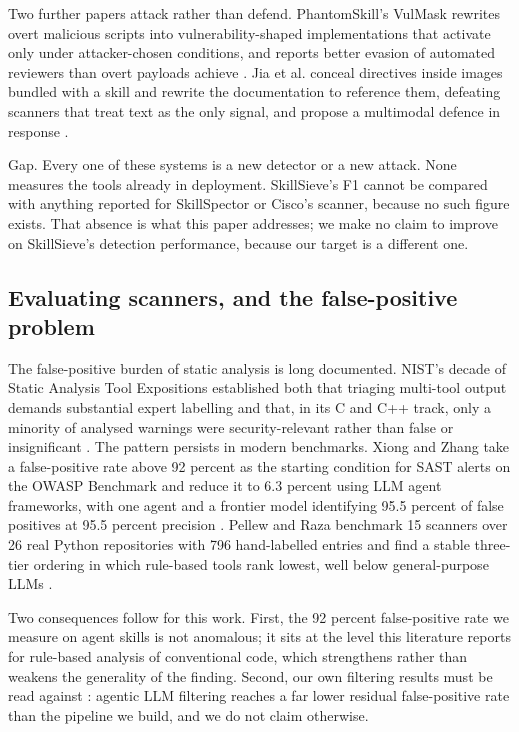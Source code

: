 \documentclass[conference]{IEEEtran}
\begin{document}
Two further papers attack rather than defend. PhantomSkill's VulMask rewrites overt malicious scripts into vulnerability-shaped implementations that activate only under attacker-chosen conditions, and reports better evasion of automated reviewers than overt payloads achieve \cite{ref12}. Jia et al. conceal directives inside images bundled with a skill and rewrite the documentation to reference them, defeating scanners that treat text as the only signal, and propose a multimodal defence in response \cite{ref13}.

Gap. Every one of these systems is a new detector or a new attack. None measures the tools already in deployment. SkillSieve's F1 cannot be compared with anything reported for SkillSpector or Cisco's scanner, because no such figure exists. That absence is what this paper addresses; we make no claim to improve on SkillSieve's detection performance, because our target is a different one.

\subsection{Evaluating scanners, and the false-positive problem}

The false-positive burden of static analysis is long documented. NIST's decade of Static Analysis Tool Expositions established both that triaging multi-tool output demands substantial expert labelling and that, in its C and C++ track, only a minority of analysed warnings were security-relevant rather than false or insignificant \cite{ref14}. The pattern persists in modern benchmarks. Xiong and Zhang take a false-positive rate above 92 percent as the starting condition for SAST alerts on the OWASP Benchmark and reduce it to 6.3 percent using LLM agent frameworks, with one agent and a frontier model identifying 95.5 percent of false positives at 95.5 percent precision \cite{ref16}. Pellew and Raza benchmark 15 scanners over 26 real Python repositories with 796 hand-labelled entries and find a stable three-tier ordering in which rule-based tools rank lowest, well below general-purpose LLMs \cite{ref15}.

Two consequences follow for this work. First, the 92 percent false-positive rate we measure on agent skills is not anomalous; it sits at the level this literature reports for rule-based analysis of conventional code, which strengthens rather than weakens the generality of the finding. Second, our own filtering results must be read against \cite{ref16}: agentic LLM filtering reaches a far lower residual false-positive rate than the pipeline we build, and we do not claim otherwise.
\end{document}
